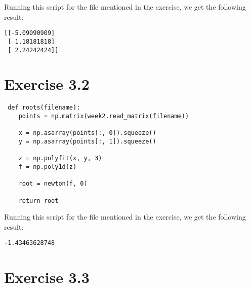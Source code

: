 \documentclass{article}
\begin{document}
Running this script for the file mentioned in the exercise, we get the following result:

\begin{lstlisting}
[[-5.09090909]
 [ 1.18181818]
 [ 2.24242424]]
\end{lstlisting}

\section{Exercise 3.2}
 
\begin{lstlisting} 
 def roots(filename):
    points = np.matrix(week2.read_matrix(filename))

    x = np.asarray(points[:, 0]).squeeze()
    y = np.asarray(points[:, 1]).squeeze()

    z = np.polyfit(x, y, 3)
    f = np.poly1d(z)

    root = newton(f, 0)

    return root
\end{lstlisting}

Running this script for the file mentioned in the exercise, we get the following result:

\begin{lstlisting}
-1.43463628748
\end{lstlisting}

\section{Exercise 3.3}
\end{document}
